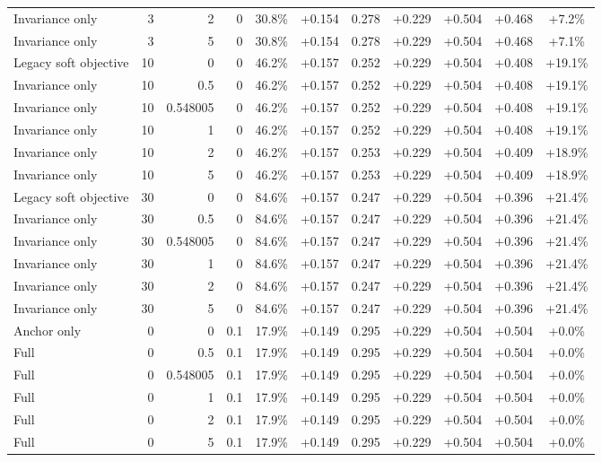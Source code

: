\begin{table}[htbp]
\begin{tabular}{lrrrccccccc}
Invariance only & 3 & 2 & 0 & 30.8\% & +0.154 & 0.278 & +0.229 & +0.504 & +0.468 & +7.2\% \\
Invariance only & 3 & 5 & 0 & 30.8\% & +0.154 & 0.278 & +0.229 & +0.504 & +0.468 & +7.1\% \\
Legacy soft objective & 10 & 0 & 0 & 46.2\% & +0.157 & 0.252 & +0.229 & +0.504 & +0.408 & +19.1\% \\
Invariance only & 10 & 0.5 & 0 & 46.2\% & +0.157 & 0.252 & +0.229 & +0.504 & +0.408 & +19.1\% \\
Invariance only & 10 & 0.548005 & 0 & 46.2\% & +0.157 & 0.252 & +0.229 & +0.504 & +0.408 & +19.1\% \\
Invariance only & 10 & 1 & 0 & 46.2\% & +0.157 & 0.252 & +0.229 & +0.504 & +0.408 & +19.1\% \\
Invariance only & 10 & 2 & 0 & 46.2\% & +0.157 & 0.253 & +0.229 & +0.504 & +0.409 & +18.9\% \\
Invariance only & 10 & 5 & 0 & 46.2\% & +0.157 & 0.253 & +0.229 & +0.504 & +0.409 & +18.9\% \\
Legacy soft objective & 30 & 0 & 0 & 84.6\% & +0.157 & 0.247 & +0.229 & +0.504 & +0.396 & +21.4\% \\
Invariance only & 30 & 0.5 & 0 & 84.6\% & +0.157 & 0.247 & +0.229 & +0.504 & +0.396 & +21.4\% \\
Invariance only & 30 & 0.548005 & 0 & 84.6\% & +0.157 & 0.247 & +0.229 & +0.504 & +0.396 & +21.4\% \\
Invariance only & 30 & 1 & 0 & 84.6\% & +0.157 & 0.247 & +0.229 & +0.504 & +0.396 & +21.4\% \\
Invariance only & 30 & 2 & 0 & 84.6\% & +0.157 & 0.247 & +0.229 & +0.504 & +0.396 & +21.4\% \\
Invariance only & 30 & 5 & 0 & 84.6\% & +0.157 & 0.247 & +0.229 & +0.504 & +0.396 & +21.4\% \\
Anchor only & 0 & 0 & 0.1 & 17.9\% & +0.149 & 0.295 & +0.229 & +0.504 & +0.504 & +0.0\% \\
Full & 0 & 0.5 & 0.1 & 17.9\% & +0.149 & 0.295 & +0.229 & +0.504 & +0.504 & +0.0\% \\
Full & 0 & 0.548005 & 0.1 & 17.9\% & +0.149 & 0.295 & +0.229 & +0.504 & +0.504 & +0.0\% \\
Full & 0 & 1 & 0.1 & 17.9\% & +0.149 & 0.295 & +0.229 & +0.504 & +0.504 & +0.0\% \\
Full & 0 & 2 & 0.1 & 17.9\% & +0.149 & 0.295 & +0.229 & +0.504 & +0.504 & +0.0\% \\
Full & 0 & 5 & 0.1 & 17.9\% & +0.149 & 0.295 & +0.229 & +0.504 & +0.504 & +0.0\% \\

\end{tabular}
\end{table}
